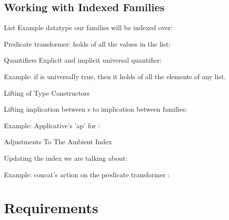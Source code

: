 \documentclass[compress,9pt]{beamer}
\begin{document}
\subsection{Working with Indexed Families}

\begin{frame}{List}
  Example datatype our families will be indexed over:


  \bigskip
  Predicate transformer:  holds of all the values in the list:

\end{frame}

\begin{frame}{Quantifiers}
  Explicit and implicit universal quantifier:


  Example: if  is universally true, then it holds of all the elements
  of any list.
\end{frame}

\begin{frame}{Lifting of Type Constructors}

  Lifting implication between s to implication between families:

  \bigskip
  Example: Applicative's 'ap' for :
\end{frame}

\begin{frame}{Adjustments To The Ambient Index}

  Updating the index we are talking about:

  \bigskip
  Example: concat's action on the predicate transformer :
\end{frame}

\section{Requirements}
\end{document}
